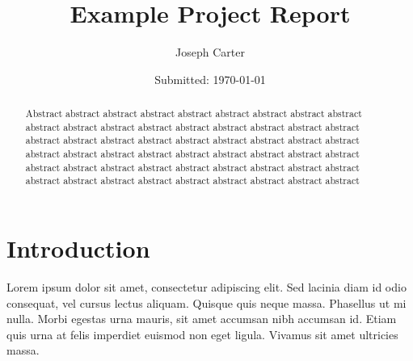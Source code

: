 \documentclass[12pt, onecolumn]{revtex4}    %
\begin{document}
                     


\title{Example Project Report} 
\date{Submitted: \today{}}
\author{Joseph Carter}

\begin{abstract}              
 
Abstract abstract abstract abstract abstract abstract abstract abstract abstract abstract abstract abstract abstract abstract abstract abstract abstract abstract abstract abstract abstract abstract abstract abstract abstract abstract abstract abstract abstract abstract abstract abstract abstract abstract abstract abstract abstract abstract abstract abstract abstract abstract abstract abstract abstract abstract abstract abstract abstract abstract abstract abstract abstract abstract 

\end{abstract}


\maketitle

\tableofcontents
\let\toc@pre\relax
\let\toc@post\relax

\newpage

\section{Introduction}

Lorem ipsum dolor sit amet, consectetur adipiscing elit. Sed lacinia diam id odio consequat, vel cursus lectus aliquam. Quisque quis neque massa. Phasellus ut mi nulla. Morbi egestas urna mauris, sit amet accumsan nibh accumsan id. Etiam quis urna at felis imperdiet euismod non eget ligula. Vivamus sit amet ultricies massa.
\end{document}
